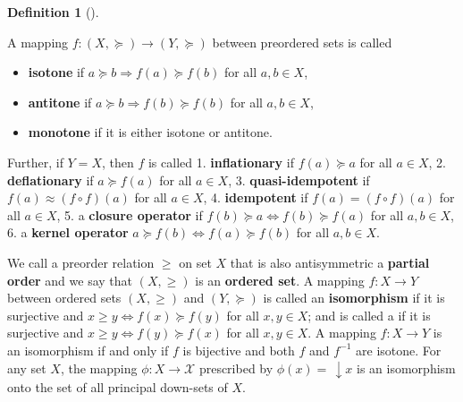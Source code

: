 \documentclass[
  letterpaper,
  10pt,
  reqno,
  twopage,
  openany]{book}
\providecommand{\tightlist}{%
  \setlength{\itemsep}{0pt}\setlength{\parskip}{0pt}}\usepackage{longtable,booktabs,array}
\theoremstyle{plain}
\theoremstyle{definition}
\theoremstyle{definition}
\newtheorem{definition}{Definition}[chapter]
\theoremstyle{definition}
\theoremstyle{plain}
\theoremstyle{plain}
\theoremstyle{remark}
\begin{document}
\leavevmode{}%
\begin{definition}[]\label{def-isotone-antitone-monotone}

A mapping \(f: (X,\succeq) \to (Y,\succeq)\) between preordered sets is
called

\begin{itemize}
\tightlist
\item
   \textbf{isotone} if
  \(a \succeq b \Rightarrow f(a) \succeq f(b)\) for all \(a,b\in X\),
\item
   \textbf{antitone} if
  \(a \succeq b \Rightarrow f(b) \succeq f(b)\) for all \(a,b\in X\),
\item
   \textbf{monotone} if it is either isotone or
  antitone.
\end{itemize}

Further, if \(Y=X\), then \(f\) is called 1. 
\textbf{inflationary} if \(f(a)\succeq a\) for all \(a\in X\), 2.
 \textbf{deflationary} if \(a\succeq f(a)\) for all
\(a\in X\), 3.  \textbf{quasi-idempotent} if
\(f(a)\approx (f\circ f)(a)\) for all \(a\in X\), 4. 
\textbf{idempotent} if \(f(a)=(f\circ f)(a)\) for all \(a\in X\), 5. a
 \textbf{closure operator} if
\(f(b)\succeq a \Leftrightarrow f(b)\succeq f(a)\) for all \(a,b\in X\),
6. a  \textbf{kernel operator}
\(a\succeq f(b) \Leftrightarrow f(a)\succeq f(b)\) for all \(a,b\in X\).

\end{definition}

We call a preorder relation \(\geq\) on set \(X\) that is also
antisymmetric a  \textbf{partial order} and we say
that \((X,\geq)\) is an  \textbf{ordered set}. A
mapping \(f:X\to Y\) between ordered sets \({(X,\geq)}\) and
\({(Y,\succeq)}\) is called an  \textbf{isomorphism}
if it is surjective and \({x \geq y \Leftrightarrow f(x) \succeq f(y)}\)
for all \(x,y\in X\); and is called a  if it is
surjective and \(x \geq y \Leftrightarrow f(y) \succeq f(x)\) for all
\(x,y\in X\). A mapping \(f: X \to Y\) is an isomorphism if and only if
\(f\) is bijective and both \(f\) and \(f^{-1}\) are isotone. For any
set \(X\), the mapping \(\phi: X\to \mathcal{X}\) prescribed by
\({\phi(x)= \, {\downarrow}{x}}\) is an isomorphism onto the set of all
principal down-sets of \(X\).
\end{document}
